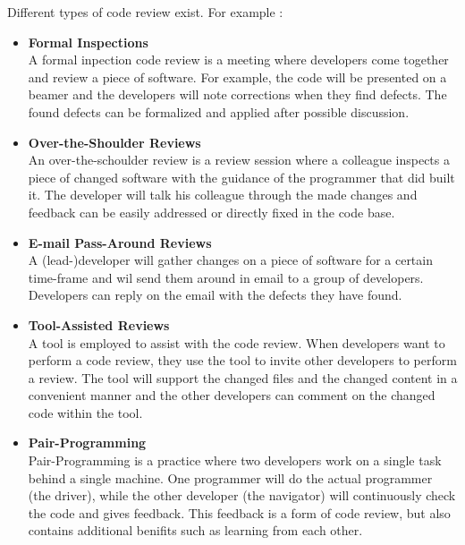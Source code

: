 Different types of code review exist. For example \autocite[23--38]{cohen2006best}:
\begin{itemize}
\setlength\itemsep{0em}
\item \textbf{Formal Inspections} \autocite[23]{cohen2006best}\\
A formal inpection code review is a meeting where developers come together and review a piece of software.
For example, the code will be presented on a beamer and the developers will note corrections when they find defects.
The found defects can be formalized and applied after possible discussion.
\item \textbf{Over-the-Shoulder Reviews} \autocite[26]{cohen2006best}\\
An over-the-schoulder review is a review session where a colleague inspects a piece of changed software with the guidance of the programmer that did built it.
The developer will talk his colleague through the made changes and feedback can be easily addressed or directly fixed in the code base.
\item \textbf{E-mail Pass-Around Reviews} \autocite[30]{cohen2006best}\\
A (lead-)developer will gather changes on a piece of software for a certain time-frame and wil send them around in email to a group of developers.
Developers can reply on the email with the defects they have found.
\item \textbf{Tool-Assisted Reviews} \autocite[34]{cohen2006best}\\
A tool is employed to assist with the code review.
When developers want to perform a code review, they use the tool to invite other developers to perform a review.
The tool will support the changed files and the changed content in a convenient manner and the other developers can comment on the changed code within the tool.
\item \textbf{Pair-Programming} \autocite[37]{cohen2006best}\\
Pair-Programming is a practice where two developers work on a single task behind a single machine.
One programmer will do the actual programmer (the driver), while the other developer (the navigator) will continuously check the code and gives feedback.
This feedback is a form of code review, but also contains additional benifits such as learning from each other.
\end{itemize}

